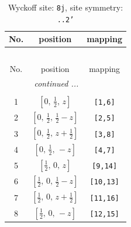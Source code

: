 \documentclass[fleqn,8pt]{jsarticle}
\begin{document}
\begin{longtable}{ccc}
\caption{Wyckoff site: {\tt 8j}, site symmetry: {\tt ..2'}}
 \\
 \hline \hline
No. & position & mapping \\ \hline \endfirsthead

\multicolumn{2}{l}{\tablename\ \thetable{}} \\
 \hline \hline
No. & position & mapping \\ \hline \endhead

 \hline \hline
\multicolumn{2}{r}{\footnotesize\it continued ...} \\ \endfoot

 \hline \hline
\multicolumn{2}{r}{} \\ \endlastfoot

1 & $\left[ 0,\, \frac{1}{2},\, z \right]$ & {\tt [1,6]} \\ \hline
2 & $\left[ 0,\, \frac{1}{2},\, \frac{1}{2} - z \right]$ & {\tt [2,5]} \\ \hline
3 & $\left[ 0,\, \frac{1}{2},\, z + \frac{1}{2} \right]$ & {\tt [3,8]} \\ \hline
4 & $\left[ 0,\, \frac{1}{2},\, - z \right]$ & {\tt [4,7]} \\ \hline
5 & $\left[ \frac{1}{2},\, 0,\, z \right]$ & {\tt [9,14]} \\ \hline
6 & $\left[ \frac{1}{2},\, 0,\, \frac{1}{2} - z \right]$ & {\tt [10,13]} \\ \hline
7 & $\left[ \frac{1}{2},\, 0,\, z + \frac{1}{2} \right]$ & {\tt [11,16]} \\ \hline
8 & $\left[ \frac{1}{2},\, 0,\, - z \right]$ & {\tt [12,15]} \\
\end{longtable}
\renewcommand{\arraystretch}{1.2}
\end{document}
